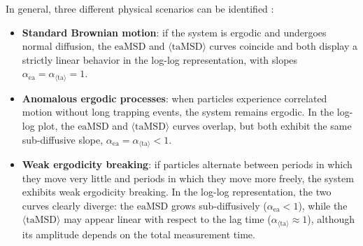 In general, three different physical scenarios can be identified \cite{C4CP03465A}:
\begin{itemize}
    \item \textbf{Standard Brownian motion}: if the system is ergodic and undergoes normal diffusion, the $\mathrm{eaMSD}$ and $\langle \mathrm{taMSD} \rangle$ curves coincide and both display a strictly linear behavior in the log-log representation, with slopes $\alpha_{\mathrm{ea}} = \alpha_{\langle \mathrm{ta} \rangle} = 1$.

    \item \textbf{Anomalous ergodic processes}: when particles experience correlated motion without long trapping events, the system remains ergodic. In the log-log plot, the $\mathrm{eaMSD}$ and $\langle \mathrm{taMSD} \rangle$ curves overlap, but both exhibit the same sub-diffusive slope, $\alpha_{\mathrm{ea}} = \alpha_{\langle \mathrm{ta} \rangle} < 1$.

    \item \textbf{Weak ergodicity breaking}: if particles alternate between periods in which they move very little and periods in which they move more freely, the system exhibits weak ergodicity breaking. In the log-log representation, the two curves clearly diverge: the $\mathrm{eaMSD}$ grows sub-diffusively ($\alpha_{\mathrm{ea}} < 1$), while the $\langle \mathrm{taMSD} \rangle$ may appear linear with respect to the lag time ($\alpha_{\langle \mathrm{ta} \rangle} \approx 1$), although its amplitude depends on the total measurement time.
\end{itemize}
\newpage

